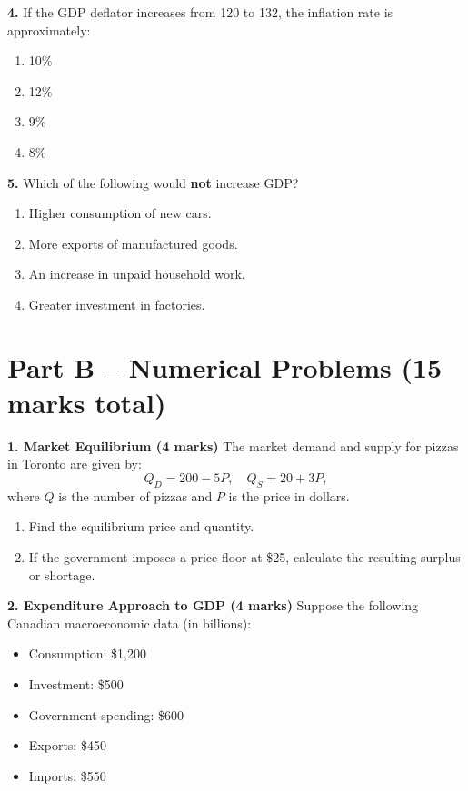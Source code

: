 \documentclass[11pt]{article}
\begin{document}
\bigskip
\newpage
\textbf{4.} If the GDP deflator increases from 120 to 132, the inflation rate is approximately:  
\begin{enumerate}[label=\alph*)]
    \item 10\%  
    \item 12\%  
    \item 9\%  
    \item 8\%  
\end{enumerate}

\bigskip

\textbf{5.} Which of the following would \textbf{not} increase GDP?  
\begin{enumerate}[label=\alph*)]
    \item Higher consumption of new cars.  
    \item More exports of manufactured goods.  
    \item An increase in unpaid household work.  
    \item Greater investment in factories.  
\end{enumerate}

\bigskip

\section*{Part B – Numerical Problems (15 marks total)}

\textbf{1. Market Equilibrium (4 marks)}  
The market demand and supply for pizzas in Toronto are given by:  
\[
Q_D = 200 - 5P, \quad Q_S = 20 + 3P,
\]  
where \(Q\) is the number of pizzas and \(P\) is the price in dollars.  

\begin{enumerate}[label=\alph*)]
    \item Find the equilibrium price and quantity.  
    \item If the government imposes a price floor at \$25, calculate the resulting surplus or shortage.  
\end{enumerate}

\bigskip

\textbf{2. Expenditure Approach to GDP (4 marks)}  
Suppose the following Canadian macroeconomic data (in billions):  

\begin{itemize}
    \item Consumption: \$1,200  
    \item Investment: \$500  
    \item Government spending: \$600  
    \item Exports: \$450  
    \item Imports: \$550  
\end{itemize}
\end{document}
